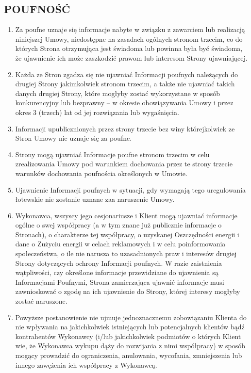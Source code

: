 \begin{multicols}{2}
\subsection{POUFNOŚĆ}
\begin{enumerate}
	\item Za poufne uznaje się informacje nabyte w związku z zawarciem lub realizacją niniejszej Umowy, niedostępne na zasadach ogólnych stronom trzecim, co do których Strona otrzymująca jest świadoma lub powinna była być świadoma, że ujawnienie ich może zaszkodzić prawom lub interesom Strony ujawniającej.
	\item Każda ze Stron zgadza się nie ujawniać Informacji poufnych należących do drugiej Strony jakimkolwiek stronom trzecim, a także nie ujawniać takich danych drugiej Strony, które mogłyby zostać wykorzystane w sposób konkurencyjny lub bezprawny – w okresie obowiązywania Umowy i przez okres 3 (trzech) lat od jej rozwiązania lub wygaśnięcia.
	\item Informacji upublicznionych przez strony trzecie bez winy którejkolwiek ze Stron Umowy nie uznaje się za poufne.
	\item Strony mogą ujawniać Informacje poufne stronom trzecim w celu zrealizowania Umowy pod warunkiem dochowania przez te strony trzecie warunków dochowania poufnościa określonych w Umowie.
	\item Ujawnienie Informacji poufnych w sytuacji, gdy wymagają tego uregulowania łotewskie nie zostanie uznane zaa naruszenie Umowy.
	\item Wykonawca, wszyscy jego cesjonariusze i Klient mogą ujawniać informacje ogólne o swej współpracy (a w tym znane już publicznie informacje o Stronach), o charakterze tej współpracy, o uzyskanej Oszczędności energii i dane o Zużyciu energii w celach reklamowych i w celu poinformowania społeczeństwa, o ile nie narusza to uzasadnionych praw i interesów drugiej Strony dotyczących ochrony Informacji poufnych. W razie zaistnienia wątpliwości, czy określone informacje przewidziane do ujawnienia są Informacjami Poufnymi, Strona zamierzająca ujawnić informacje musi zawnioskować o zgodę na ich ujawnienie do Strony, której interesy mogłyby zostać naruszone.
	\item Powyższe postanowienie nie ujmuje jednoznacznemu zobowiązaniu Klienta do nie wpływania na jakichkolwiek istniejących lub potencjalnych klientów bądź kontrahentów Wykonawcy (i/lub jakichkolwiek podmiotów o których Klient wie, że Wykonawca wykupu dąży do rozwijania z nimi współpracy) w sposób mogący prowadzić do ograniczenia, anulowania, wycofania, zmniejszenia lub innego zawężenia ich współpracy z Wykonawcą.

\end{enumerate}
\end{multicols}
